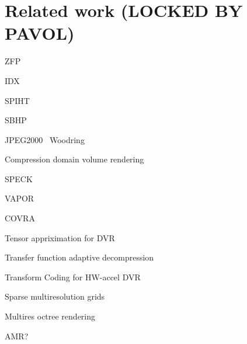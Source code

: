 \section{Related work (LOCKED BY PAVOL)}
ZFP~\cite{zfp2014}

IDX~\cite{idx2001}

SPIHT~\cite{spiht1996}


SBHP~\cite{sbhp2000}

JPEG2000~\cite{jpeg2001}
Woodring~\cite{woodring2011}

Compression domain volume rendering~\cite{compression_domain2003}

SPECK~\cite{speck2004}

VAPOR~\cite{vapor2007}

COVRA~\cite{covra2012}

Tensor appriximation for DVR~\cite{tensor_dvr2015}

Transfer function adaptive decompression~\cite{tf_decompression2004}

Transform Coding for HW-accel DVR~\cite{hw_dvr2007}


Sparse multiresolution grids~\cite{vdb2013,spgrid2014}

Multires octree rendering~\cite{multires_octree1999}

AMR?
